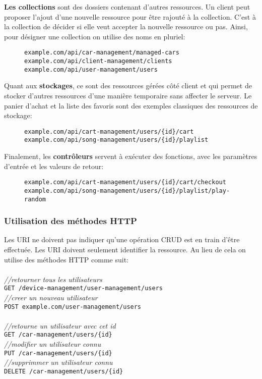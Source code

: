 \textbf{Les collections} sont des dossiers contenant d'autres ressources. Un client peut proposer l'ajout d'une nouvelle ressource pour être rajouté à la collection. C'est à la collection de décider si elle veut accepter la nouvelle ressource ou pas. Ainsi, pour désigner une collection on utilise des noms en pluriel: 
\begin{figure}[h!]
	\begin{lstlisting}[frame=leftline]
example.com/api/car-management/managed-cars
example.com/api/client-management/clients
example.com/api/user-management/users
	\end{lstlisting}
\end{figure}

Quant aux \textbf{stockages}, ce sont des ressources gérées côté client et qui permet de stocker d'autres ressources d'une manière temporaire sans affecter le serveur. Le panier d'achat et la liste des favoris sont des exemples classiques des ressources de stockage: 
\begin{figure}[h!]
	\begin{lstlisting}[frame=leftline]
example.com/api/cart-management/users/{id}/cart
example.com/api/song-management/users/{id}/playlist
	\end{lstlisting}
\end{figure}

Finalement, les \textbf{contrôleurs} servent à exécuter des fonctions, avec les paramètres d'entrée et les valeurs de retour: 
\begin{figure}[h!]
	\begin{lstlisting}[frame=leftline]
example.com/api/cart-management/users/{id}/cart/checkout
example.com/api/song-management/users/{id}/playlist/play-random
	\end{lstlisting}
\end{figure}

\subsubsection{Utilisation des méthodes HTTP}
Les URI ne doivent pas indiquer qu'une opération CRUD est en train d'être effectuée. Les URI doivent seulement identifier la ressource. Au lieu de cela on utilise des méthodes HTTP comme suit: \\
\\
\emph{//retourner tous les utilisateurs\\}
\verb|GET /device-management/user-management/users|\\
\emph{//creer un nouveau utilisateur\\}
\verb|POST example.com/user-management/users|
\\
\\
\emph{//retourne un utilisateur avec cet id\\}
\verb|GET /car-management/users/{id}|\\
\emph{//modifier un utilisateur connu\\}
\verb|PUT /car-management/users/{id}|\\
\emph{//supprimmer un utilisateur connu\\}
\verb|DELETE /car-management/users/{id}|\\



